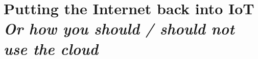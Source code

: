 \newcommand\Chapter[2]{\chapter
		[#1\hfil\hbox{}\protect\linebreak{\itshape#2}]%
		{#1\\[2ex]\Large\itshape#2}%
}
\Chapter{Putting the Internet back into IoT}{Or how you should / should not use the cloud}

\alelogo

\minitoc

\clearpage















%


